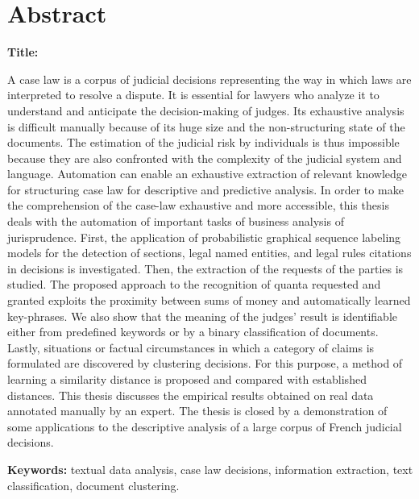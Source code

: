 \chapter*{Abstract}
\textbf{Title:} \textsc{\titleen}

A case law is a corpus of judicial decisions representing the way in which laws are interpreted to resolve a dispute. It is essential for lawyers who analyze it to understand and anticipate the decision-making of judges. Its exhaustive analysis is difficult manually because of its huge size and the non-structuring state of the documents. The estimation of the judicial risk by individuals is thus impossible because they are also confronted with the complexity of the judicial system and language. Automation can enable an exhaustive extraction of relevant knowledge for structuring case law for descriptive and predictive analysis.
In order to make the comprehension of the case-law exhaustive and more accessible, this thesis deals with the automation of important tasks of business analysis of jurisprudence. First, the application of probabilistic graphical sequence labeling models for the detection of sections, legal named entities, and legal rules citations in decisions is investigated. Then, the extraction of the requests of the parties is studied. The proposed approach to the recognition of quanta requested and granted exploits the proximity between sums of money and automatically learned key-phrases. We also show that the meaning of the judges' result is identifiable either from predefined keywords or by a binary classification of documents. Lastly, situations or factual circumstances in which a category of claims is formulated are discovered by clustering decisions. For this purpose, a method of learning a similarity distance is proposed and compared with established distances.
This thesis discusses the empirical results obtained on real data annotated manually by an expert. The thesis is closed by a demonstration of some applications to the descriptive analysis of a large corpus of French judicial decisions.

\textbf{Keywords:} textual data analysis, case law decisions, information extraction, text classification, document clustering.